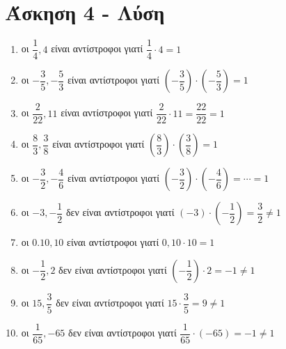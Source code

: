 \documentclass[a4paper,10pt]{report}
\begin{document}

\newpage
\section*{Άσκηση 4 - Λύση\hfill \small{}}
\begin{enumerate}[1)]
 \item οι $\dfrac{1}{4},4$ είναι αντίστροφοι γιατί $\dfrac{1}{4}\cdot4=1$
 \item οι $-\dfrac{3}{5},-\dfrac{5}{3}$ είναι αντίστροφοι γιατί $(-\dfrac{3}{5})\cdot(-\dfrac{5}{3})=1$ 
 \item οι $\dfrac{2}{22},11$ είναι αντίστροφοι γιατί $\dfrac{2}{22}\cdot11=\dfrac{22}{22}=1$
 \item οι $\dfrac{8}{3},\dfrac{3}{8}$ είναι αντίστροφοι γιατί $(\dfrac{8}{3})\cdot(\dfrac{3}{8})=1$ 
 \item οι $-\dfrac{3}{2},-\dfrac{4}{6}$ είναι αντίστροφοι γιατί $(-\dfrac{3}{2})\cdot(-\dfrac{4}{6})=\cdots=1$
 \item οι $-3,-\dfrac{1}{2}$ δεν είναι αντίστροφοι γιατί $(-3)\cdot(-\dfrac{1}{2})=\dfrac{3}{2}\neq1$
 \item οι $0.10,10$ είναι αντίστροφοι γιατί $0,10\cdot10=1$ 
 \item οι $-\dfrac{1}{2},2$ δεν είναι αντίστροφοι γιατί $(-\dfrac{1}{2})\cdot2=-1\neq1$
 \item οι $15,\dfrac{3}{5}$ δεν είναι αντίστροφοι γιατί $15\cdot\dfrac{3}{5}=9\neq1$
 \item οι $\dfrac{1}{65},-65$ δεν είναι αντίστροφοι γιατί $\dfrac{1}{65}\cdot(-65)=-1\neq1$
\end{enumerate}
\end{document}
